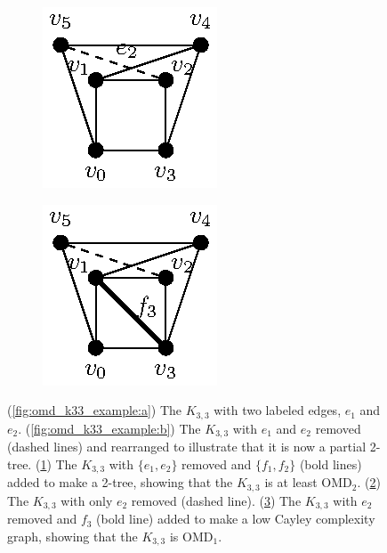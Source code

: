 \begin{figure}
\begin{subfigure}{.15\linewidth}
        \caption{}\label{fig:omd_k33_example:c}
    \end{subfigure}\hfill
    \begin{subfigure}{.15\linewidth}\centering
        \includegraphics[height=\myMinHeight]{img/epsfromtikz/omd_k33_example-1}
        \caption{}\label{fig:omd_k33_example:d}
    \end{subfigure}
    \begin{subfigure}{.15\linewidth}\centering
        \includegraphics[height=\myMinHeight]{img/epsfromtikz/omd_k33_example-2}
        \caption{}\label{fig:omd_k33_example:e}
    \end{subfigure}

    \caption{
    (\ref{fig:omd_k33_example:a}) The $K_{3,3}$ with two labeled edges, $e_1$ and $e_2$. (\ref{fig:omd_k33_example:b}) The $K_{3,3}$ with $e_1$ and $e_2$ removed (dashed lines) and rearranged to illustrate that it is now a partial 2-tree. (\ref{fig:omd_k33_example:c}) The $K_{3,3}$ with $\{e_1,e_2\}$ removed and $\{f_1,f_2\}$ (bold lines) added to make a 2-tree, showing that the $K_{3,3}$ is at least OMD$_2$. (\ref{fig:omd_k33_example:d}) The $K_{3,3}$ with only $e_2$ removed (dashed line). (\ref{fig:omd_k33_example:e}) The $K_{3,3}$ with $e_2$ removed and $f_3$ (bold line) added to make a low Cayley complexity graph, showing that the $K_{3,3}$ is OMD$_1$.
    }
    \label{fig:omd_k33_example}
\end{figure}


